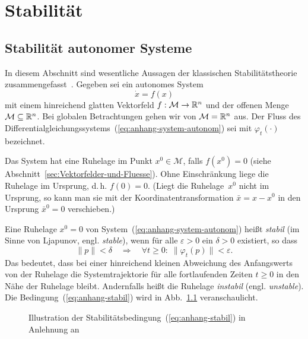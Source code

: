 
\appendix

\chapter{Stabilität\label{chap:introA}}

\section{Stabilität autonomer Systeme\label{sec:Stabilitaet-autonomer-Systeme}}

In diesem Abschnitt sind wesentliche Aussagen der klassischen Stabilitätstheorie
zusammengefasst~\cite{hahn1967,slotine1991,sastry1999,khalil2002}.
Gegeben sei ein autonomes System
\begin{equation}
\dot{x}=f(x)\label{eq:anhang-system-autonom}
\end{equation}
mit einem hinreichend glatten Vektorfeld $f:\mathcal{M}\to{\mathbb{R}}^{n}$
und der offenen Menge $\mathcal{M}\subseteq{\mathbb{R}}^{n}$. Bei globalen
Betrachtungen gehen wir von $\mathcal{M}={\mathbb{R}}^{n}$ aus. Der Fluss des
Differentialgleichungssystems~(\ref{eq:anhang-system-autonom}) sei
mit $\varphi_{t}(\cdot)$ bezeichnet.

Das System hat eine Ruhelage im Punkt $x^{0}\in\mathcal{M}$,
falls $f(x^{0})=0$ (siehe Abschnitt~\ref{sec:Vektorfelder-und-Fluesse}).
Ohne Einschränkung liege die Ruhelage im Ursprung, d.\,h. $f(0)=0$.
(Liegt die Ruhelage~$x^{0}$ nicht im Ursprung, so kann man sie mit
der Koordinatentransformation $\bar{x}=x-x^{0}$ in den Ursprung $\bar{x}^{0}=0$
verschieben.)

Eine Ruhelage $x^{0}=0$ von System~(\ref{eq:anhang-system-autonom})
heißt\emph{ stabil} (im Sinne von Ljapunov, engl. \emph{stable}),
wenn für alle $\varepsilon>0$ ein $\delta>0$ existiert, so dass
\begin{equation}
\|p\|<\delta\quad\Longrightarrow\quad\forall t\geq0:\;\|\varphi_{t}(p)\|<\varepsilon.\label{eq:anhang-stabil}
\end{equation}
Das bedeutet, dass bei einer hinreichend kleinen Abweichung des Anfangswerts
von der Ruhelage die Systemtrajektorie für alle fortlaufenden Zeiten
$t\geq0$ in den Nähe der Ruhelage bleibt. Andernfalls heißt die Ruhelage
\emph{instabil} (engl. \emph{unstable}). Die Bedingung~(\ref{eq:anhang-stabil})
wird in Abb.~\ref{fig:stabil-im-Sinne-Lyapunov} veranschaulicht.

\begin{figure}
\begin{centering}
\resizebox{0.87\textwidth}{!}{}
\par\end{centering}
\caption{Illustration der Stabilitätsbedingung~(\ref{eq:anhang-stabil}) in
Anlehnung an~\cite{slotine1991}\label{fig:stabil-im-Sinne-Lyapunov}}

\end{figure}

